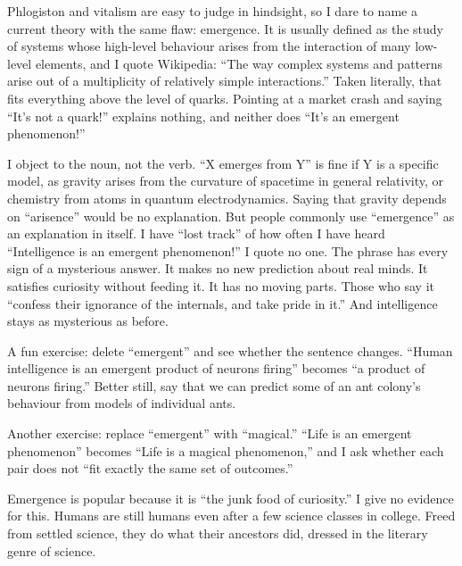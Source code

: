
Phlogiston and vitalism are easy to judge in hindsight, so I dare to name a current theory with the same flaw: emergence. It is usually defined as the study of systems whose high-level behaviour arises from the interaction of many low-level elements, and I quote Wikipedia: ``The way complex systems and patterns arise out of a multiplicity of relatively simple interactions.'' Taken literally, that fits everything above the level of quarks. Pointing at a market crash and saying ``It's not a quark!'' explains nothing, and neither does ``It's an emergent phenomenon!'' 

I object to the noun, not the verb. ``X emerges from Y'' is fine if Y is a specific model, as gravity arises from the curvature of spacetime in general relativity, or chemistry from atoms in quantum electrodynamics. Saying that gravity depends on ``arisence'' would be no explanation. But people commonly use ``emergence'' as an explanation in itself. I have ``lost track'' of how often I have heard ``Intelligence is an emergent phenomenon!'' I quote no one. The phrase has every sign of a mysterious answer. It makes no new prediction about real minds. It satisfies curiosity without feeding it. It has no moving parts. Those who say it ``confess their ignorance of the internals, and take pride in it.'' And intelligence stays as mysterious as before.

A fun exercise: delete ``emergent'' and see whether the sentence changes. ``Human intelligence is an emergent product of neurons firing'' becomes ``a product of neurons firing.'' Better still, say that we can predict some of an ant colony's behaviour from models of individual ants. 

Another exercise: replace ``emergent'' with ``magical.'' ``Life is an emergent phenomenon'' becomes ``Life is a magical phenomenon,'' and I ask whether each pair does not ``fit exactly the same set of outcomes.'' 

Emergence is popular because it is ``the junk food of curiosity.'' I give no evidence for this. Humans are still humans even after a few science classes in college. Freed from settled science, they do what their ancestors did, dressed in the literary genre of science.
